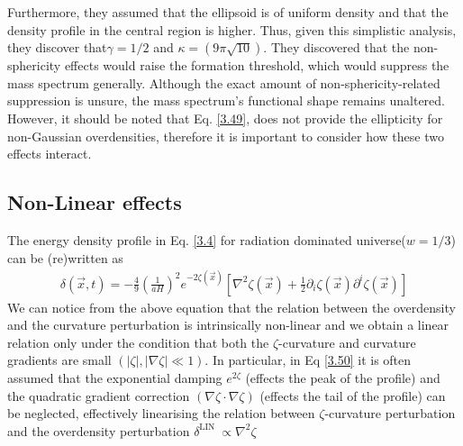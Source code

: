 Furthermore, they assumed that the ellipsoid is of uniform density and that the density profile in the central region is higher. Thus, given this simplistic analysis, they discover that$\gamma = 1/2 $ and $\kappa = (9\pi \sqrt{10})$.
They discovered that the non-sphericity effects would raise the formation threshold, which would suppress the mass spectrum generally. Although the exact amount of non-sphericity-related suppression is unsure, the mass spectrum's functional shape remains unaltered. However, it should be noted that  Eq. \ref{3.49}, does not provide the ellipticity for non-Gaussian overdensities, therefore it is important to consider how these two effects interact.

\subsection{Non-Linear effects}

The energy density profile in Eq. \ref{3.4} for radiation dominated universe($w = 1/3$) can be (re)written as
\begin{align}
    \delta(\vec{x}, t)=-\frac{4}{9} (\frac{1}{aH})^{2} e^{-2 \zeta(\vec{x})}\left[\nabla^2 \zeta(\vec{x})+\frac{1}{2} \partial_i \zeta(\vec{x}) \partial^i \zeta(\vec{x})\right] \label{3.50}
\end{align}
We can notice from the above equation that the relation between the overdensity and the curvature perturbation is intrinsically non-linear and we obtain a linear relation only under the condition that both the $\zeta$-curvature and curvature gradients are small $\left(\left|\zeta\right|,\left|\nabla \zeta\right| \ll 1\right)$. In particular, in Eq  \ref{3.50} it is often assumed that the exponential damping $e^{2 \zeta}$ (effects the peak of the profile) and the quadratic gradient correction $\left(\nabla \zeta \cdot \nabla \zeta\right)$ (effects the tail of the profile) can be neglected, effectively linearising the relation between $\zeta$-curvature perturbation and the overdensity perturbation $\delta^{\text {LIN }} \propto \nabla^2 \zeta$


